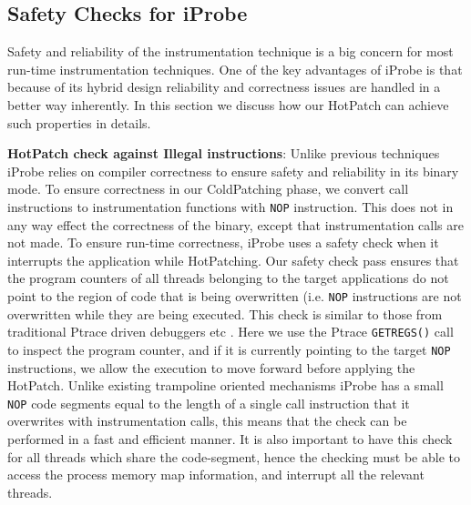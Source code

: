 \subsection{Safety Checks for iProbe}
\label{sec:safety}

Safety and reliability of the instrumentation technique is a big concern for most run-time instrumentation techniques.
One of the key advantages of iProbe is that because of its hybrid design reliability and correctness issues are handled in a better way inherently.
In this section we discuss how our HotPatch can achieve such properties in details.

\indent \textbf{HotPatch check against Illegal instructions}: \quad
Unlike previous techniques iProbe relies on compiler correctness to ensure safety and reliability in its binary mode.
To ensure correctness in our ColdPatching phase, we convert call instructions to instrumentation functions with \texttt{NOP} instruction. 
This does not in any way effect the correctness of the binary, except that instrumentation calls are not made. 
To ensure run-time correctness, iProbe uses a safety check when it interrupts the application while HotPatching. 
Our safety check pass ensures that the program counters of all threads belonging to the target applications do not point to the region of code that is being overwritten (i.e. \texttt{NOP} instructions are not overwritten while they are being executed.
This check is similar to those from traditional Ptrace\cite{ptrace} driven debuggers etc \cite{kaho,livepatch,pannus}. 
Here we use the Ptrace \texttt{GETREGS()} call to inspect the program counter, and if it is currently pointing to the target \texttt{NOP} instructions, we allow the execution to move forward before applying the HotPatch. 
Unlike existing trampoline oriented mechanisms iProbe has a small \texttt{NOP} code segments equal to the length of a single call instruction that it overwrites with instrumentation calls, this means that the check can be performed in a fast and efficient manner. 
It is also important to have this check for all threads which share the code-segment, hence the checking must be able to access the process memory map information, and interrupt all the relevant threads.

